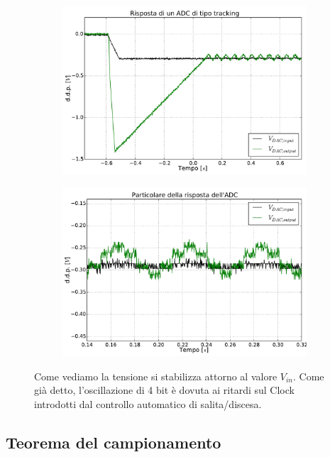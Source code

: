\begin{figure}[htpc]
\centering
	\begin{subfigure}[hc]{.49\textwidth}
		\centering
		\includegraphics[width=.99\textwidth]{../E13/latex/tracker.pdf}
		\caption{}
		\label{gr13:track}
        \end{subfigure}%
        \begin{subfigure}[hc]{.49\textwidth}
		\centering
		\includegraphics[width=.99\textwidth]{../E13/latex/zoom.pdf}
		\caption{}
		\label{gr13:zoom}
        \end{subfigure}
\caption{Come vediamo la tensione si stabilizza attorno al valore $V_{in}$. Come già detto, l'oscillazione di 4 bit è dovuta ai ritardi sul Clock introdotti dal controllo automatico di salita/discesa.}
\end{figure}

\subsection{Teorema del campionamento}

